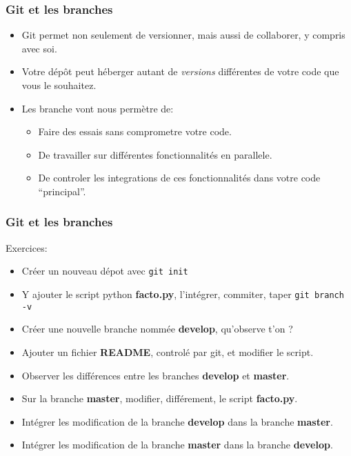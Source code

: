 \documentclass{beamer}
\begin{document}
\begin{frame}[fragile]\frametitle{Git et les branches}
  \begin{itemize}
  \item Git permet non seulement de versionner, mais aussi de collaborer, y compris avec soi.
  \item Votre dépôt peut héberger autant de {\em versions} différentes de votre code que vous le souhaitez.
  \item Les branche vont nous permètre de:
    \begin{itemize}
    \item Faire des essais sans comprometre votre code.
    \item De travailler sur différentes fonctionnalités en parallele.
    \item De controler les integrations de ces fonctionnalités dans votre code {``principal''}.
    \end{itemize}
  \end{itemize}
\end{frame}

\begin{frame}[fragile]\frametitle{Git et les branches}
  Exercices:
  \begin{itemize}
  \item Créer un nouveau dépot avec {\tt git init}
  \item Y ajouter le script python {\bf facto.py}, l'intégrer, commiter, taper {\tt git branch -v}
  \item Créer une nouvelle branche nommée {\bf develop}, qu'observe t'on ?
  \item Ajouter un fichier {\bf README}, controlé par git, et modifier le script.
  \item Observer les différences entre les branches {\bf develop} et {\bf master}.
  \item Sur la branche {\bf master}, modifier, différement, le script {\bf facto.py}.
  \item Intégrer les modification de la branche {\bf develop} dans la branche {\bf master}.
  \item Intégrer les modification de la branche {\bf master} dans la branche {\bf develop}.
  \end{itemize}
\end{frame}
\end{document}
